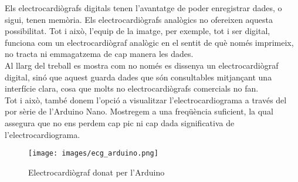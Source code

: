 \noindent Els electrocardiògrafs digitals tenen l'avantatge de poder enregistrar dades, o sigui, tenen memòria. Els electrocardiògrafs analògics no ofereixen aquesta possibilitat. Tot i això, l'equip de la imatge, per exemple, tot i ser digital, funciona com un electrocardiògraf analògic en el sentit de què només imprimeix, no tracta ni emmagatzema de cap manera les dades.\\
\newline Al llarg del treball es mostra com no només es dissenya un electrocardiògraf digital, sinó que aquest guarda dades que són consultables mitjançant una interfície clara, cosa que molts no electrocardiògrafs comercials no fan.\\
\newline Tot i això, també donem l'opció a visualitzar l'electrocardiograma a través del por sèrie de l'Arduino Nano. Mostregem a una freqüència suficient, la qual assegura que no ens perdem cap pic ni cap dada significativa de l'electrocardiograma.
\begin{figure}[H]
\begin{center}
\texttt{[image: images/ecg\_arduino.png]}
\end{center}
\caption{Electrocardiògraf donat per l'Arduino}
\label{fig: ecg_arduino}
\end{figure}
%

%




